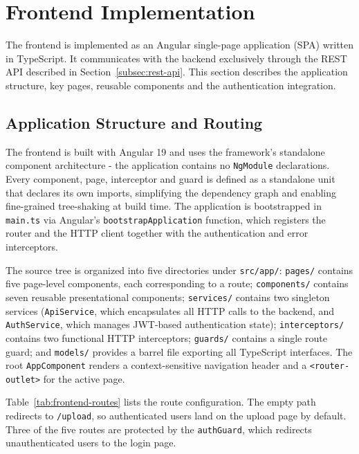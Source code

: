 \section{Frontend Implementation}
\label{sec:frontend-impl}

 \par The frontend is implemented as an Angular single-page application (SPA) written in TypeScript. It communicates with the backend exclusively through the REST API described in Section~\ref{subsec:rest-api}. This section describes the application structure, key pages, reusable components and the authentication integration.

\subsection{Application Structure and Routing}
\label{subsec:frontend-structure}

 \par The frontend is built with Angular 19 and uses the framework's standalone component architecture - the application contains no \texttt{NgModule} declarations. Every component, page, interceptor and guard is defined as a standalone unit that declares its own imports, simplifying the dependency graph and enabling fine-grained tree-shaking at build time. The application is bootstrapped in \texttt{main.ts} via Angular's \texttt{bootstrapApplication} function, which registers the router and the HTTP client together with the authentication and error interceptors.

The source tree is organized into five directories under \texttt{src/app/}: \texttt{pages/} contains five page-level components, each corresponding to a route; \texttt{components/} contains seven reusable presentational components; \texttt{services/} contains two singleton services (\texttt{ApiService}, which encapsulates all HTTP calls to the backend, and \texttt{AuthService}, which manages JWT-based authentication state); \texttt{interceptors/} contains two functional HTTP interceptors; \texttt{guards/} contains a single route guard; and \texttt{models/} provides a barrel file exporting all TypeScript interfaces. The root \texttt{AppComponent} renders a context-sensitive navigation header and a \texttt{<router-outlet>} for the active page.

Table~\ref{tab:frontend-routes} lists the route configuration. The empty path redirects to \texttt{/upload}, so authenticated users land on the upload page by default. Three of the five routes are protected by the \texttt{authGuard}, which redirects unauthenticated users to the login page.

